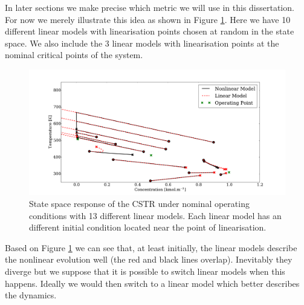 \documentclass[../masters.tex]{subfiles}
\begin{document}
In later sections we make precise which metric we will use in this dissertation. For now we merely illustrate this idea as shown in Figure \ref{fig_cstr_many}. Here we have 10 different linear models with linearisation points chosen at random in the state space. We also include the 3 linear models with linearisation points at the nominal critical points of the system. 
\begin{figure}[H] 
\centering
\includegraphics[scale=0.3]{cstr_lin_many.pdf}
\caption{State space response of the CSTR under nominal operating conditions with 13 different linear models. Each linear model has an different initial condition located near the point of linearisation.}
\label{fig_cstr_many}
\end{figure}
Based on Figure \ref{fig_cstr_many} we can see that, at least initially, the linear models describe the nonlinear evolution well (the red and black lines overlap). Inevitably they diverge but we suppose that it is possible to switch linear models when this happens. Ideally we would then switch to a linear model which better describes the dynamics. 



\end{document}

